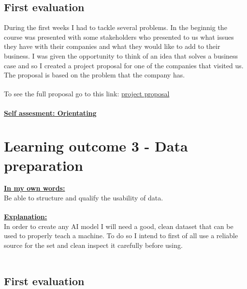\documentclass{article}
\begin{document}
\subsection{First evaluation}
During the first weeks I had to tackle several problems. In the beginnig the course was presented with some stakeholders 
who presented to us what issues they have with their companies and what they would like to add to their business. I was given 
the opportunity to think of an idea that solves a business case and so I created a project proposal for one of the companies that visited us. 
The proposal is based on the problem that the company has.\\\\
To see the full proposal go to this link: \href{https://github.com/BurovDanil/MinorAI/blob/main/Documents/Project%20Proposal/Proposal.md}{project proposal}\\\\
  \underline{\textbf{Self assesment: Orientating}}

\section{Learning outcome 3 - Data preparation}
\underline{\textbf{In my own words:}}\\
Be able to structure and qualify the usability of data.\\\\
\underline{\textbf{Explanation:}}\\
In order to create any AI model I will need a good, clean dataset that can be used to properly teach a machine.
To do so I intend to first of all use a reliable source for the set and clean inspect it carefully before using.\\\\
\subsection{First evaluation}
\end{document}

